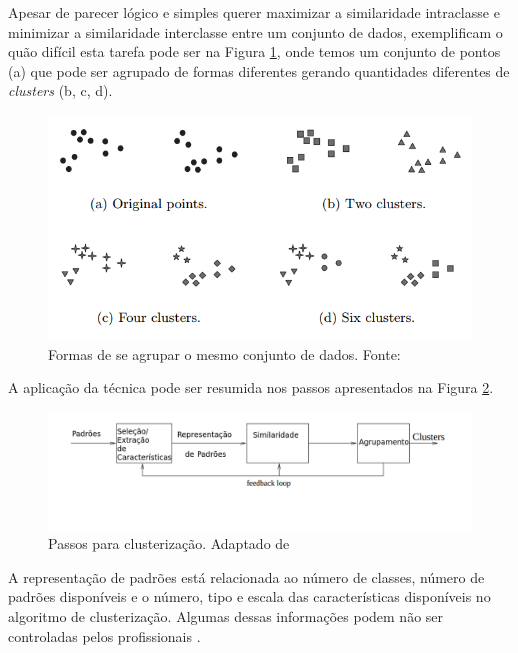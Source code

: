 Apesar de parecer lógico e simples querer maximizar a similaridade intraclasse e minimizar a similaridade interclasse entre um conjunto de dados, 
 exemplificam o quão difícil esta tarefa pode ser na Figura \ref{fig:clusters_difficulty}, onde temos um conjunto
de pontos (a) que pode ser agrupado de formas diferentes gerando quantidades diferentes de \textit{clusters} (b, c, d).

\begin{figure}[h!]
\centering
\includegraphics[scale=0.4]{figuras/clusters_difficulty.png}
\caption{Formas de se agrupar o mesmo conjunto de dados. Fonte: \cite{tan2013data}}
\label{fig:clusters_difficulty}
\end{figure}

A aplicação da técnica pode ser resumida nos passos apresentados na Figura \ref{fig:tasks_clustering}.

\begin{figure}[h!]
\centering
\includegraphics[scale=0.6]{figuras/tasks_clustering.png}
\caption{Passos para clusterização. Adaptado de }
\label{fig:tasks_clustering}
\end{figure}

A representação de padrões está relacionada ao número de classes, número de padrões disponíveis e o número, tipo e escala
das características disponíveis no algoritmo de clusterização. Algumas dessas informações podem não ser controladas pelos
profissionais \cite{clustering_review}.

